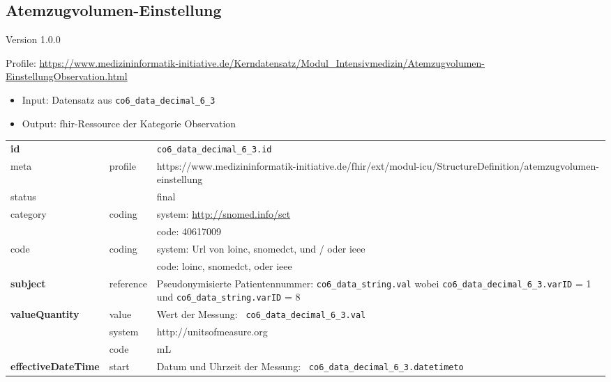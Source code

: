 \subsection{Atemzugvolumen-Einstellung} 
\noindent Version 1.0.0

\noindent Profile: \url{https://www.medizininformatik-initiative.de/Kerndatensatz/Modul_Intensivmedizin/Atemzugvolumen-EinstellungObservation.html}

\begin{itemize}
\item Input: Datensatz aus \texttt{co6\_data\_decimal\_6\_3}
\item Output: \ac{fhir}-Ressource der Kategorie \glqq Observation\grqq{}
\end{itemize}

\newpage

\begin{longtable}{|l|l|p{7.5cm}|}
        \hline
        \rowcolor{lightgray} \multicolumn{3}{|l|}{Data Mapping (inhaltlich)} \\ \hline
        \textbf{id} &  & \texttt{co6\_data\_decimal\_6\_3.id} \\ \hline
	meta & profile & https://www.medizininformatik-initiative.de/fhir/ext/modul-icu/StructureDefinition/atemzugvolumen-einstellung \\ \hline 
	status &  & final   \\ \hline 
	category & coding & system: \url{http://snomed.info/sct} \\
\cline{3-3}
	& & code: 40617009 \\ \hline
	code & coding & system: Url von \ac{loinc}, \ac{snomedct}, und / oder \ac{ieee} \\ 
	\cline{3-3} 
	 &  & code: \ac{loinc}, \ac{snomedct}, oder \ac{ieee} \\ \hline
	 \textbf{subject} & reference & Pseudonymisierte Patientennummer: \texttt{co6\_data\_string.val} wobei \texttt{co6\_data\_decimal\_6\_3.varID} = 1 und \texttt{co6\_data\_string.varID} = 8 \\ \hline
	 \textbf{valueQuantity}  & value & Wert der Messung: \texttt{
co6\_data\_decimal\_6\_3.val} \\
        \cline{2-3}
         & system & http://unitsofmeasure.org \\
         \cline{2-3}
         & code & mL
\\ \hline
     \textbf{effectiveDateTime}  & start & Datum und Uhrzeit der Messung: \texttt{
co6\_data\_decimal\_6\_3.datetimeto} \\
     \hline
\end{longtable}



